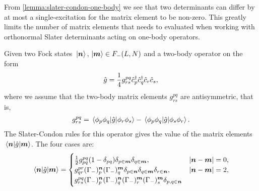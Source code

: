             From \autoref{lemma:slater-condon-one-body} we see that two
            determinants can differ by at most a single-excitation for the
            matrix element to be non-zero.
            This greatly limits the number of matrix elements that needs to
            evaluated when working with orthonormal Slater determinants acting
            on one-body operators.
            \begin{lemma}
                \label{lemma:slater-condon-two-body}
                Given two Fock states $\ket*{\boldsymbol{n}}, \ket*{\boldsymbol{m}} \in F_{-}(L,
                N)$ and a two-body operator on the form
                \begin{align}
                    \hat{g} = \frac{1}{4}g^{pq}_{rs}\hat{c}_{p}^{\dagger}\hat{c}_{q}^{\dagger}\hat{c}_{r}\hat{c}_{s},
                \end{align}
                where we assume that the two-body matrix elements $g^{pq}_{rs}$
                are antisymmetric, that is,
                \begin{align}
                    g^{pq}_{rs}
                    = \mel*{\phi_p\phi_q}{\hat{g}}{\phi_r\phi_s}
                    - \mel*{\phi_p\phi_q}{\hat{g}}{\phi_s\phi_r}.
                \end{align}
                The Slater-Condon rules for this operator gives the value of the
                matrix elements $\mel*{\boldsymbol{n}}{\hat{g}}{\boldsymbol{m}}$.
                The four cases are:
                \begin{gather}
                    \mel*{\boldsymbol{n}}{\hat{g}}{\boldsymbol{m}}
                    = \begin{cases}
                        \frac{1}{2} g^{pq}_{pq}(1 - \delta_{pq})
                        \delta_{p \in \boldsymbol{m}}
                        \delta_{q \in \boldsymbol{m}},
                        & \abs{\boldsymbol{n} - \boldsymbol{m}} = 0,
                        \\
                        g^{pr}_{qr}
                        (\Gamma_{-})^{\boldsymbol{n}}_{p}
                        (\Gamma_{-})^{\boldsymbol{m}}_{q}
                        \delta_{p \in \boldsymbol{n}}
                        \delta_{q \in \boldsymbol{m}}
                        \delta_{r \in \boldsymbol{n}},
                        & \abs{\boldsymbol{n} - \boldsymbol{m}} = 2,
                        \\
                        g^{pq}_{rs}
                        (\Gamma_{-})^{\boldsymbol{n}}_{p}
                        (\Gamma_{-})^{\boldsymbol{n}}_{q}
                        (\Gamma_{-})^{\boldsymbol{m}}_{r}
                        (\Gamma_{-})^{\boldsymbol{m}}_{s}
                        \delta_{p, q \in \boldsymbol{n}}

\end{cases}
\end{gather}
\end{lemma}
